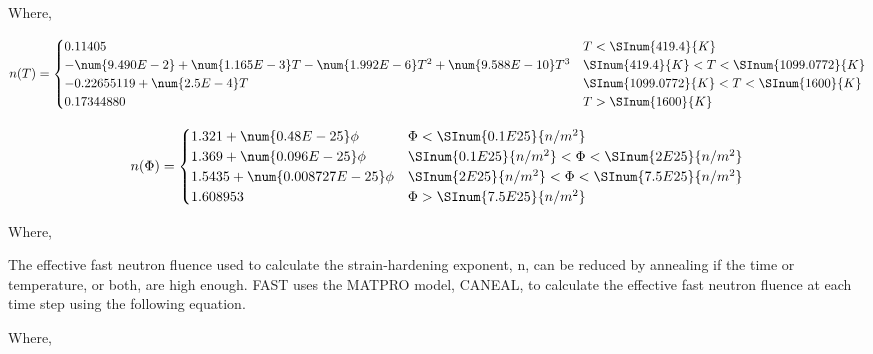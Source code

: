 Where,

\begin{equation}
    n(T) = 
    \begin{cases}
        0.11405                                                                                         & T<\SInum{419.4}{K}            \\
        -\num{9.490E-2}+\num{1.165E-3}T-\num{1.992E-6} T^2 +\num{9.588E-10} T^3 & \SInum{419.4}{K}<T<\SInum{1099.0772}{K} \\
        -0.22655119+\num{2.5E-4}T                                                                 & \SInum{1099.0772}{K}<T<\SInum{1600}{K}  \\
        0.17344880                                                                                      & T>\SInum{1600}{K}
    \end{cases}
\end{equation}

\begin{equation}
    n(\Phi) = 
    \begin{cases}
            1.321+\num{0.48E-25} \phi                   & \Phi<\SInum{0.1E25}{n/m^2}\\
            1.369+\num{0.096E-25} \phi                  & \SInum{0.1E25}{n/m^2}< \Phi< \SInum{2E25}{n/m^2}\\
            1.5435+\num{0.008727E-25} \phi              & \SInum{2E25}{n/m^2}< \Phi<\SInum{7.5E25}{n/m^2}\\
            1.608953                                    & \Phi>\SInum{7.5E25}{n/m^2}
    \end{cases}
\end{equation}

Where,

The effective fast neutron fluence used to calculate the strain-hardening exponent, n, can be
reduced by annealing if the time or temperature, or both, are high enough. FAST uses the MATPRO
model, CANEAL, to calculate the effective fast neutron fluence at each time step using the following
equation.

Where,

